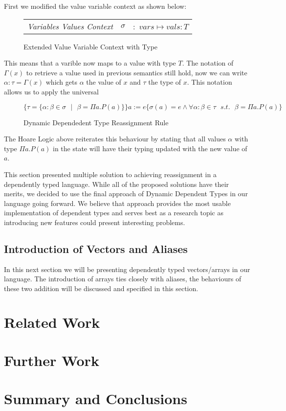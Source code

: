 \documentclass[a4paper,12pt]{report}
\begin{document}
\par
First we modified the value variable context as shown below:
 
\begin{figure}[H]
  \begin{center}
    \begin{tabular} {l l l}
      \textit{Variables Values Context} & $\sigma$& $:$ $vars \mapsto vals : T$ 
    \end{tabular}
  \end{center}
  \caption{Extended Value Variable Context with Type}
\end{figure}

This means that a varible now maps to a value with type $T$. The notation of 
$\Gamma(x)$ to retrieve a value used in previous semantics still hold, now we 
can write $\alpha : \tau = \Gamma(x)$ which gets $\alpha$ the value of $x$ 
and $\tau$ the type of $x$. This notation allows us to apply the universal 

\begin{figure}[H]
  \begin{center}
    \footnotesize$\{\tau = \{\alpha : \beta \in \sigma\text{ }|\text{ }\beta = \Pi a. P(a)\}\}a := e\{\sigma(a) = e \wedge 
    \forall \alpha : \beta \in \tau\text{ }s.t.\text{ }\beta = \Pi a. P(a)\}$ 
    \normalsize
  \end{center}
  \caption{Dynamic Dependedent Type Reassignment Rule}
\end{figure}


\par
The Hoare Logic above reiterates this behaviour by stating that all values $\alpha$ with 
type $\Pi a.P(a)$ in the state will have their typing updated with the new value 
of $a$.

This section presented multiple solution to achieving reassignment in a 
dependently typed language. While all of the proposed solutions have their 
merits, we decided to use the final approach of Dynamic Dependent Types in our 
language going forward. We believe that approach provides the most usable 
implementation of dependent types and serves best as a research topic as 
introducing new features could present interesting problems. 

\section{Introduction of Vectors and Aliases}
In this next section we will be presenting dependently typed vectors/arrays in 
our language. The introduction of arrays ties closely with aliases, the 
behaviours of these two addition will be discussed and specified in this 
section.





\chapter{Related Work}

\chapter{Further Work}

\chapter{Summary and Conclusions} 


\appendix
\singlespacing

\printbibliography
\end{document}
